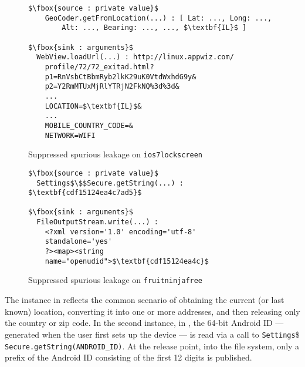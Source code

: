 \begin{figure*}
\begin{minipage}[b]{0.95\columnwidth}
\begin{lstlisting}
$\fbox{source : private value}$
    GeoCoder.getFromLocation(...) : [ Lat: ..., Long: ...,
	    Alt: ..., Bearing: ..., ..., $\textbf{IL}$ ]
	
$\fbox{sink : arguments}$
  WebView.loadUrl(...) : http://linux.appwiz.com/
    profile/72/72_exitad.html?
    p1=RnVsbCtBbmRyb2lkK29uK0VtdWxhdG9y&
    p2=Y2RmMTUxMjRlYTRjN2FkNQ%3d%3d&
    ...
    LOCATION=$\textbf{IL}$&
    ...
    MOBILE_COUNTRY_CODE=&
    NETWORK=WIFI
\end{lstlisting}
\caption{\label{Fi:ios7}Suppressed spurious leakage on {\tt ios7lockscreen}}
\end{minipage}
\hfill
\begin{minipage}[b]{0.95\columnwidth}
\begin{lstlisting}
$\fbox{source : private value}$
  Settings$\$$Secure.getString(...) : $\textbf{cdf15124ea4c7ad5}$

$\fbox{sink : arguments}$
  FileOutputStream.write(...) :
    <?xml version='1.0' encoding='utf-8'
    standalone='yes'
    ?><map><string
    name="openudid">$\textbf{cdf15124ea4c}$
\end{lstlisting}
\caption{\label{Fi:fruitninja}Suppressed spurious leakage on {\tt fruitninjafree}}
\end{minipage}
\end{figure*}


The instance in  reflects the common scenario of obtaining the current (or last known) location, converting it into one or more addresses, and then releasing only the country or zip code. In the second instance, in , the 64-bit Android ID --- generated when the user first sets up the device --- is read via a call to \texttt{Settings$\$$Secure.getString(ANDROID\_ID)}. At the release point, into the file system, only a prefix of the Android ID consisting of the first 12 digits is published.

